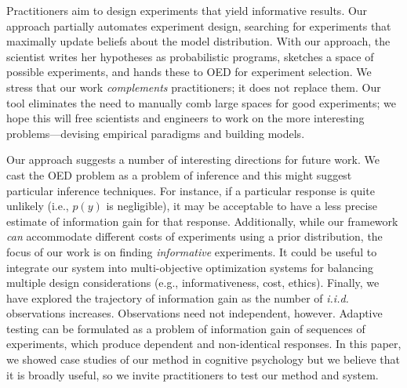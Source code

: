\documentclass{article}
\begin{document}
Practitioners aim to design experiments that yield informative results.
Our approach partially automates experiment design, searching for experiments that maximally update beliefs about the model distribution.
With our approach, the scientist writes her hypotheses as probabilistic programs, sketches a space of possible experiments, and hands these to OED for experiment selection.
We stress that our work \emph{complements} practitioners; it does not replace them.
Our tool eliminates the need to manually comb large spaces for good experiments; we hope this will free scientists and engineers to work on the more interesting problems---devising empirical paradigms and building models.

Our approach suggests a number of interesting directions for future work.
We cast the OED problem as a problem of inference and this might suggest particular inference techniques.
For instance, if a particular response is quite unlikely (i.e., $p(y)$ is negligible), it may be acceptable to have a less precise estimate of information gain for that response.
Additionally, while our framework \emph{can} accommodate different costs of experiments using a prior distribution, the focus of our work is on finding \emph{informative} experiments.
It could be useful to integrate our system into multi-objective optimization systems for balancing multiple design considerations (e.g., informativeness, cost, ethics).
Finally, we have explored the trajectory of information gain as the number of \emph{i.i.d.} observations increases.
Observations need not independent, however.
Adaptive testing can be formulated as a problem of information gain of sequences of experiments, which produce dependent and non-identical responses.
In this paper, we showed case studies of our method in cognitive psychology but we believe that it is broadly useful, so we invite practitioners to test our method and system.



\end{document}
